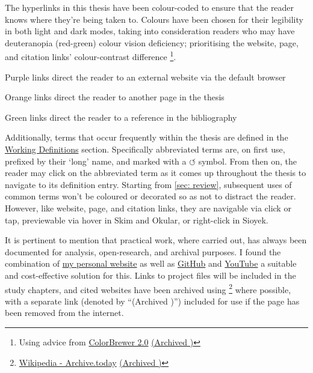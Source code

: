 \begin{SingleSpace}
\noindent The hyperlinks in this thesis have been colour-coded to ensure that the reader knows where they're being taken to. Colours have been chosen for their legibility in both light and dark modes, taking into consideration readers who may have deuteranopia (red-green) colour vision deficiency; prioritising the \textcolor{Hyurlcolor}{website}, \textcolor{Hylinkcolor}{page}, and \textcolor{Hycitecolor}{citation} links' colour-contrast difference \footnote{Using advice from \href{https://colorbrewer2.org/\#type=qualitative\&scheme=Dark2}{ColorBrewer 2.0} \href{https://archive.today/oRW5e}{(Archived \faArchive)}}.

\vspace*{0.25cm}
\noindent\textcolor{Hyurlcolor}{Purple} links direct the reader to an external website via the default browser

\noindent\textcolor{Hylinkcolor}{Orange} links direct the reader to another page in the thesis

\noindent\textcolor{Hycitecolor}{Green} links direct the reader to a reference in the bibliography

\vspace*{0.25cm}
\noindent Additionally, terms that occur frequently within the thesis are defined in the \hyperref[main]{Working Definitions} section. Specifically abbreviated terms are, on first use, prefixed by their `long' name, and marked with a \textcolor{Hylinkcolor}{$\circlearrowleft$} symbol. From then on, the reader may click on the abbreviated term as it comes up throughout the thesis to navigate to its definition entry. Starting from \autoref{sec: review}, subsequent uses of common terms won't be coloured or decorated so as not to distract the reader. However, like \textcolor{Hyurlcolor}{website}, \textcolor{Hylinkcolor}{page}, and \textcolor{Hycitecolor}{citation} links, they are navigable via click or tap, previewable via hover in Skim and Okular, or right-click in Sioyek.

It is pertinent to mention that practical work, where carried out, has always been documented for analysis, open-research, and archival purposes. I found the combination of \href{https://sambilbow.github.io}{my personal website} as well as \href{https://github.com/sambilbow}{GitHub} and \href{https://youtube.com/@sambilbow}{YouTube} a suitable and cost-effective solution for this. Links to project files will be included in the study chapters, and cited websites have been archived using  \footnote{\href{https://en.wikipedia.org/wiki/Archive.today}{Wikipedia - Archive.today} \href{https://archive.today/dWUvw}{(Archived \faArchive)}} where possible, with a separate link (denoted by ``(Archived \faArchive)'') included for use if the page has been removed from the internet. 


\end{SingleSpace}
